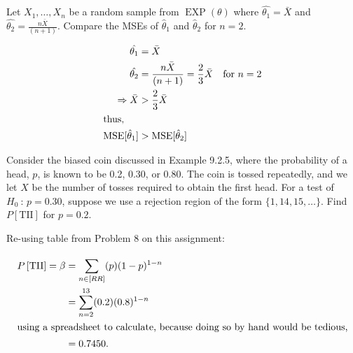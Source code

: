 \documentclass[answers]{exam}
\begin{document}
\begin{questions}
\question 
Let \(X_1,\ldots,X_n\) be a random sample from \(\operatorname{EXP}(\theta)\) where \(\hat{\theta_1}=\bar{X}\) and \(\hat{\theta_2}=\frac{n\bar{X}}{(n+1)}\). 
Compare the MSEs of \(\hat{\theta}_1\) and \(\hat{\theta}_2\) for \(n=2\).
\begin{solution}
	\begin{align*}
		\hat{\theta_1} &= \bar{X} \\
		\hat{\theta_2} & = \frac{n\bar{X}}{(n+1)} 
		= \frac{2}{3}\bar{X} \quad \text{for } n=2 \\
		\Rightarrow \bar{X} &> \frac{2}{3}\bar{X} \\
		\intertext{thus,}
		\text{MSE}[\hat{\theta}_1] &> \text{MSE}[\hat{\theta}_2]
	\end{align*}
\end{solution}

\question 
Consider the biased coin discussed in Example 9.2.5, where the probability of a
head, \(p\), is known to be 0.2, 0.30, or 0.80. 
The coin is tossed repeatedly, and we let \(X\) be the number of tosses 
required to obtain the first head. For a test of \(H_0\ :\,p=0.30\), 
suppose we use a rejection region of the form \(\{1,14,15,\ldots\}\). 
Find \(P\left[\text{TII}\right]\) for \(p=0.2\).
\begin{solution}
	Re-using table from Problem 8 on this assignment:
	
	\begin{align*}
		P\left[\text{TII}\right]=\beta&=\sum_{n\in[RR]}^{}(p)(1-p)^{1-n} \\
		&=\sum_{n=2}^{13}(0.2)(0.8)^{1-n} \\
		\intertext{using a spreadsheet to calculate, because doing so by hand would be tedious,}
		&= 0.7450.
	\end{align*}
\end{solution}

\end{questions}
\end{document}
